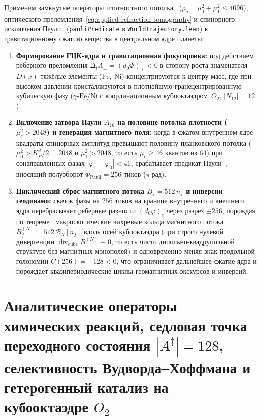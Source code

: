 Применим замкнутые операторы плотностного потолка~ ($\rho_q = \mu_0^2+\mu_1^2 \le 4096$), оптического преломления~\eqref{eq:applied-refraction-tomography} и спинорного исключения Паули~ (\texttt{pauliPredicate} в \texttt{WorldTrajectory.lean}) к гравитационному сжатию вещества в центральном ядре планеты:
\begin{enumerate}[leftmargin=*]
\item \textbf{Формирование ГЦК-ядра и гравитационная фокусировка:}
  под действием реберного преломления $\Delta_t A_\perp = (d_0\Phi)_\perp < 0$ в сторону роста знаменателя~$D(x)$ тяжёлые элементы ($\mathrm{Fe},\ \mathrm{Ni}$) концентрируются к центру масс, где при высоком давлении кристаллизуются в плотнейшую гранецентрированную кубическую фазу ($\gamma\text{-}\mathrm{Fe}/\mathrm{Ni}$ с координационным кубооктаэдром~$O_2$, $|N_{12}|=12$).
\item \textbf{Включение затвора Паули $A_{16}$ на половине потолка плотности ($\mu_c^2 > 2048$) и генерация магнитного поля:}
  когда в сжатом внутреннем ядре квадраты спинорных амплитуд превышают половину планковского потолка ($\mu_0^2 > K_P^2/2 = 2048$ и $\mu_1^2 > 2048$, то есть $\mu_c \ge 46$ квантов из $64$) при сонаправленных фазах $|\varphi_1-\varphi_0| < 41$, срабатывает предикат Паули~, вносящий полуоборот $\Phi_{\mathrm{Pauli}} = 256$ тиков ($\pi\ \text{рад}$).
\item \textbf{Циклический сброс магнитного потока $B_f = 512\,n_f$ и инверсии геодинамо:}
  скачок фазы на $256$ тиков на границе внутреннего и внешнего ядра перебрасывает реберные разности $(d_0\varphi)_e$ через разрез $\pm 256$, порождая по теореме~ макроскопические вихревые кольца магнитного потока $B_f^{(N)} = 512\,\mathcal{B}_N[n_f]$ вдоль осей кубооктаэдра (при строго нулевой дивергенции $\operatorname{div}_{\mathrm{cube}} B^{(N)} \equiv 0$, то есть чисто дипольно-квадрупольной структуре без магнитных монополей) и одновременно меняя знак продольной голономии $C(256) = -128 < 0$, что ограничивает дальнейшее сжатие ядра и порождает квазипериодические циклы геомагнитных экскурсов и инверсий.
\end{enumerate}

\chapter{Аналитические операторы химических реакций, седловая точка переходного состояния \texorpdfstring{$|A^\ddagger|=128$}{|A|=128}, селективность Вудворда--Хоффмана и гетерогенный катализ на кубооктаэдре \texorpdfstring{$O_2$}{O2}}
\label{ch:applied-chemical-reactions-catalysis}

